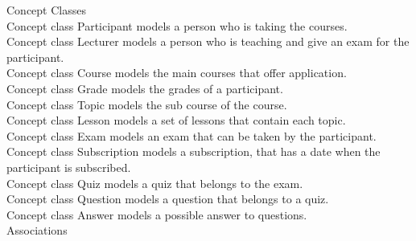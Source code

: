 \documentclass{scrartcl}
\begin{document}
Concept Classes \\

Concept class Participant models a person who is taking the courses. \\
Concept class Lecturer models a person who is teaching and give an exam for the participant.\\
Concept class Course models the main courses that offer application.\\
Concept class Grade models the grades of a participant.\\
Concept class Topic models the sub course of the course.\\
Concept class Lesson models a set of lessons that contain each topic.\\
Concept class Exam models an exam that can be taken by the participant.\\
Concept class Subscription models a subscription, that has a date when the participant is subscribed.\\
Concept class Quiz models a quiz that belongs to the exam.\\
Concept class Question models a question that belongs to a quiz.\\
Concept class Answer models a possible answer to questions.\\

Associations\\
\end{document}

